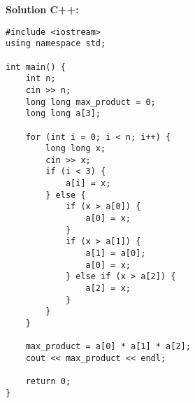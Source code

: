 \documentclass[12pt]{scrartcl}  %
\begin{document}
\textbf{Solution C++:}

\begin{lstlisting}
#include <iostream>
using namespace std;

int main() {
    int n;
    cin >> n;
    long long max_product = 0;
    long long a[3];
    
    for (int i = 0; i < n; i++) {
        long long x;
        cin >> x;
        if (i < 3) {
            a[i] = x;
        } else {
            if (x > a[0]) {
                a[0] = x;
            }
            if (x > a[1]) {
                a[1] = a[0];
                a[0] = x;
            } else if (x > a[2]) {
                a[2] = x;
            }
        }
    }
    
    max_product = a[0] * a[1] * a[2];
    cout << max_product << endl;
    
    return 0;
}
\end{lstlisting}
\end{document}
